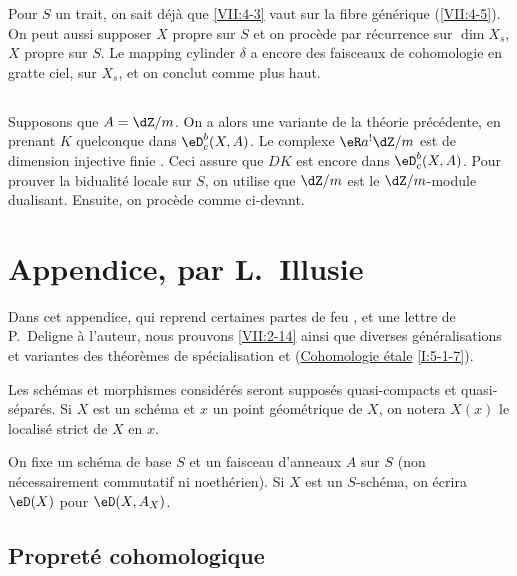 Pour $S$ un trait, on sait déjà que \ref{VII:4-3} vaut sur la fibre 
générique (\ref{VII:4-5}). On peut aussi supposer $X$ propre sur $S$ et on 
procède par récurrence sur $\dim{X_s}$, $X$ propre sur $S$. Le mapping 
cylinder $\delta$ a encore des faisceaux de cohomologie en gratte ciel, sur 
$X_s$, et on conclut comme plus haut. 





\subsection{}\label{VII:4-7}

Supposons que $A=\dZ/m$. On a alors une variante de la théorie 
précédente, en prenant $K$ quelconque dans $\eD_c^b(X,A)$. Le complexe 
$\eR a^! \dZ/m$ est de dimension injective finie \cite[XVIII 3.1.7]{sga4}. Ceci 
assure que $D K$ est encore dans $\eD_c^b(X,A)$. Pour prouver la bidualité 
locale sur $S$, on utilise que $\dZ/m$ est le $\dZ/m$-module dualisant. 
Ensuite, on procède comme ci-devant. 










\section{Appendice, par L.\ Illusie}\label{VII:5}

Dans cet appendice, qui reprend certaines partes de feu \cite[II]{sga5}, et 
une lettre de P.\ Deligne à l'auteur, nous prouvons \ref{VII:2-14} ainsi que 
diverses généralisations et variantes des théorèmes de spécialisation 
\cite[XVI 2.1]{sga4} et (\hyperref[I]{Cohomologie étale} \ref{I:5-1-7}). 

Les schémas et morphismes considérés seront supposés quasi-compacts et 
quasi-séparés. Si $X$ est un schéma et $x$ un point géométrique de 
$X$, on notera $X(x)$ le localisé strict de $X$ en $x$. 

On fixe un schéma de base $S$ et un faisceau d'anneaux $A$ sur $S$ (non 
nécessairement commutatif ni noethérien). Si $X$ est un $S$-schéma, on 
écrira $\eD(X)$ pour $\eD(X,A_X)$. 





\subsection{Propreté cohomologique}\label{VII:5-1}





